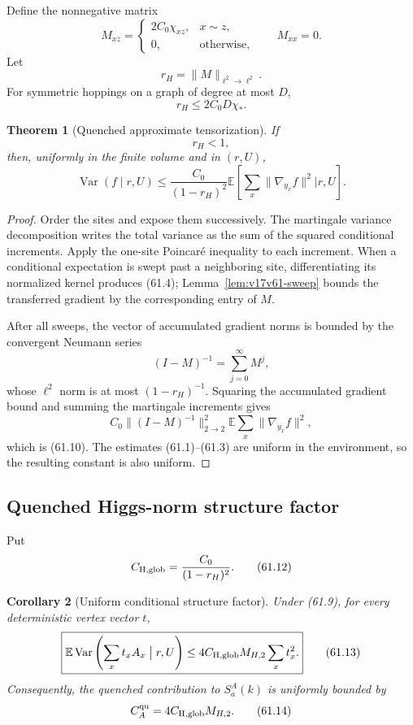 \documentclass[11pt]{article}
\newtheorem{theorem}{Theorem}[section]
\newtheorem{corollary}[theorem]{Corollary}
\theoremstyle{remark}
\begin{document}
Define the nonnegative matrix
\[
 M_{xz}=
 \begin{cases}
 2C_0\chi_{xz},&x\sim z,\\
 0,&\text{otherwise},
 \end{cases}
 \qquad M_{xx}=0.                                 \tag{61.6}
\]
Let
\[
 r_H=\|M\|_{\ell^2\to\ell^2}.                     \tag{61.7}
\]
For symmetric hoppings on a graph of degree at most \(D\),
\[
 r_H\leq2C_0D\chi_*.                              \tag{61.8}
\]

\begin{theorem}[Quenched approximate tensorization]
\label{thm:v17v61-tensor}
If
\[
\boxed{r_H<1,}                                    \tag{61.9}
\]
then, uniformly in the finite volume and in \((r,U)\),
\[
\boxed{
 \operatorname{Var}(f\mid r,U)
 \leq
 \frac{C_0}{(1-r_H)^2}
 \mathbb E\left[
 \sum_x\|\nabla_{y_x}f\|^2
 \mathrel{\big|}r,U\right].}                     \tag{61.10}
\]
\end{theorem}

\begin{proof}
Order the sites and expose them successively.  The martingale
variance decomposition writes the total variance as the sum of the
squared conditional increments.  Apply the one-site Poincar\'e
inequality to each increment.  When a conditional expectation is
swept past a neighboring site, differentiating its normalized kernel
produces (61.4); Lemma~\ref{lem:v17v61-sweep} bounds the transferred
gradient by the corresponding entry of \(M\).

After all sweeps, the vector of accumulated gradient norms is bounded
by the convergent Neumann series
\[
 (I-M)^{-1}
 =
 \sum_{j=0}^\infty M^j,                            \tag{61.11}
\]
whose \(\ell^2\) norm is at most \((1-r_H)^{-1}\).
Squaring the accumulated gradient bound and summing the martingale
increments gives
\[
 C_0\|(I-M)^{-1}\|_{2\to2}^2
 \mathbb E\sum_x\|\nabla_{y_x}f\|^2,
\]
which is (61.10).  The estimates (61.1)--(61.3) are uniform in the
environment, so the resulting constant is also uniform.
\end{proof}

\subsection{Quenched Higgs-norm structure factor}

Put
\[
 C_{\rm H,glob}
 =
 \frac{C_0}{(1-r_H)^2}.                            \tag{61.12}
\]

\begin{corollary}[Uniform conditional structure factor]
\label{cor:v17v61-structure}
Under (61.9), for every deterministic vertex vector \(t\),
\[
\boxed{
 \mathbb E\operatorname{Var}
 \left(\sum_xt_xA_x\mathrel{\big|}r,U\right)
 \leq
 4C_{\rm H,glob}M_{H,2}\sum_xt_x^2.}              \tag{61.13}
\]
Consequently, the quenched contribution to \(S_a^A(k)\) is uniformly
bounded by
\[
 C_A^{\rm qu}=4C_{\rm H,glob}M_{H,2}.             \tag{61.14}
\]
\end{corollary}
\end{document}
